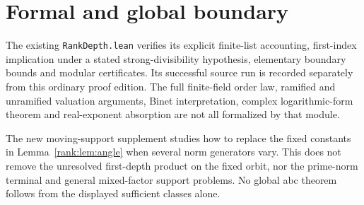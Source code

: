 \section{Formal and global boundary}
The existing \texttt{RankDepth.lean} verifies its explicit finite-list accounting, first-index implication under a stated strong-divisibility hypothesis, elementary boundary bounds and modular certificates. Its successful source run is recorded separately from this ordinary proof edition. The full finite-field order law, ramified and unramified valuation arguments, Binet interpretation, complex logarithmic-form theorem and real-exponent absorption are not all formalized by that module.

The new moving-support supplement studies how to replace the fixed constants in Lemma~\ref{rank:lem:angle} when several norm generators vary. This does not remove the unresolved first-depth product on the fixed orbit, nor the prime-norm terminal and general mixed-factor support problems. No global abc theorem follows from the displayed sufficient classes alone.


\endgroup
